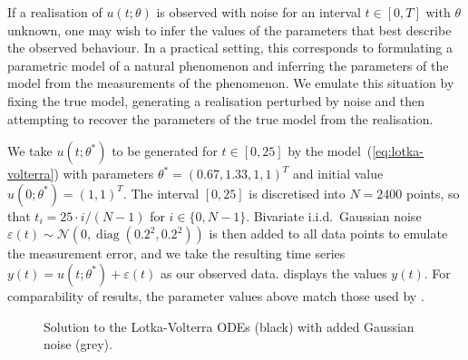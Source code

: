 \documentclass[11pt,a4paper]{report}
\DeclareMathOperator{\diag}{diag}
\begin{document}
If a realisation of $u(t; \theta)$ is observed with noise for an interval $t \in [0, T]$ with $\theta$ unknown, one may wish to infer the values of the parameters that best describe the observed behaviour. In a practical setting, this corresponds to formulating a parametric model of a natural phenomenon and inferring the parameters of the model from the measurements of the phenomenon. We emulate this situation by fixing the true model, generating a realisation perturbed by noise and then attempting to recover the parameters of the true model from the realisation.

We take $u(t;\theta^*)$ to be generated for $t \in [0, 25]$ by the model~(\ref{eq:lotka-volterra}) with parameters $\theta^* = (0.67, 1.33, 1, 1)^T$ and initial value $u(0; \theta^*) = (1, 1)^T$. The interval $[0, 25]$ is discretised into $N = 2400$ points, so that $t_i = 25 \cdot i / (N - 1)$ for $i \in \{0, N - 1\}$. Bivariate i.i.d.\ Gaussian noise $\varepsilon(t) \sim \mathcal{N}\left( 0, \diag(0.2^2, 0.2^2) \right)$ is then added to all data points to emulate the measurement error, and we take the resulting time series $y(t) = u(t;\theta^*) + \varepsilon(t)$ as our observed data.  displays the values $y(t)$. For comparability of results, the parameter values above match those used by \cite{riabizOptimalThinningMCMC2022}. 

\begin{figure}[t]
\centering
{}
\caption{Solution to the Lotka-Volterra ODEs (black) with added Gaussian noise (grey).
\label{fig:lotka-volterra:data}}
\end{figure}
\end{document}
